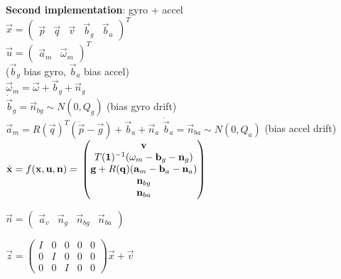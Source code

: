 \textbf{Second implementation}: gyro + accel\\
$\vec{x} = \begin{pmatrix}\vec{p}   & \vec{q} & \vec{v} &
\vec{b}_g & \vec{b}_a \end{pmatrix}^T$\\
$\vec{u} = \begin{pmatrix}\vec{a}_m & \vec{\omega}_m\end{pmatrix}^T$\\
($\vec{b}_g$ bias gyro, $\vec{b}_a$ bias accel)\\
$\vec{\omega}_m = \vec{\omega} + \vec{b}_g + \vec{n}_g$\\
$\dot{\vec{b}}_g = \vec{n}_{bg} \sim N(0, Q_g)$ (bias gyro drift)\\
$\vec{a}_m = R(\vec{q})^T (\ddot{\vec{p}} - \vec{g}) + \vec{b}_a +
\vec{n}_a$
$\dot{\vec{b}}_a = \vec{n}_{ba} \sim N(0, Q_a)$ (bias accel drift)\\

$\dot{\vec{x}} = f(\vec{x}, \vec{u}, \vec{n}) = \\
 \begin{pmatrix}
   \vec{v}\\
   T(\vec{1})^{-1} ( \vec{\omega}_m - \vec{b}_g - \vec{n}_g)\\
   \vec{g} + R(\vec{q})(\vec{a}_m - \vec{b}_a - \vec{n}_a)\\
   \vec{n}_{bg} \\
   \vec{n}_{ba}
 \end{pmatrix}$

$\vec{n} =
\begin{pmatrix} \vec{a}_v & \vec{n}_g & \vec{n}_{bg} & \vec{n}_{ba}\end{pmatrix}$

$\vec{z} = \begin{pmatrix}
I & 0 & 0 & 0 & 0\\
0 & I & 0 & 0 & 0\\
0 & 0 & I & 0 & 0
\end{pmatrix} \vec{x} +
\vec{v}$
